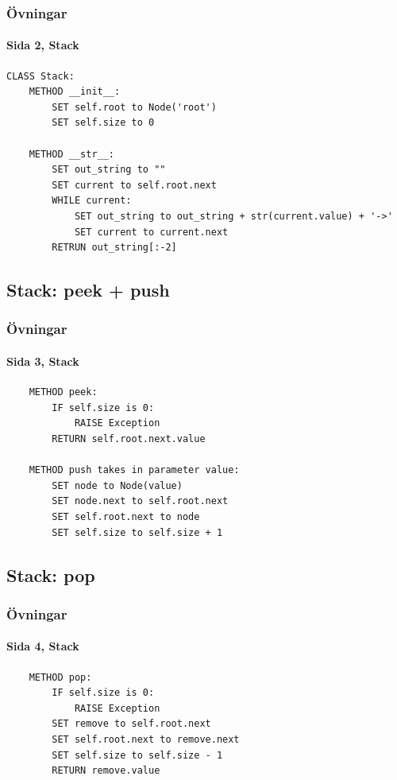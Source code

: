 \documentclass[aspectratio=169]{beamer}
\begin{document}
\begin{frame}[fragile]
	\frametitle{Övningar}
	\framesubtitle{Sida 2, Stack}
	
	\begin{lstlisting}
CLASS Stack:
    METHOD __init__:
        SET self.root to Node('root')
        SET self.size to 0
        
    METHOD __str__:
        SET out_string to ""
        SET current to self.root.next
        WHILE current:
            SET out_string to out_string + str(current.value) + '->'
            SET current to current.next
        RETRUN out_string[:-2]
	\end{lstlisting}
	
\end{frame}

\subsection{Stack: peek + push}

\begin{frame}[fragile]
	\frametitle{Övningar}
	\framesubtitle{Sida 3, Stack}
	
	\begin{lstlisting}
    METHOD peek:
        IF self.size is 0:
            RAISE Exception
        RETURN self.root.next.value
        
    METHOD push takes in parameter value:
        SET node to Node(value)
        SET node.next to self.root.next
        SET self.root.next to node
        SET self.size to self.size + 1
	\end{lstlisting}
	
\end{frame}

\subsection{Stack: pop}

\begin{frame}[fragile]
	\frametitle{Övningar}
	\framesubtitle{Sida 4, Stack}
	
	\begin{lstlisting}
    METHOD pop:
        IF self.size is 0:
            RAISE Exception
        SET remove to self.root.next
        SET self.root.next to remove.next
        SET self.size to self.size - 1
        RETURN remove.value
	\end{lstlisting}
	
\end{frame}
\end{document}

